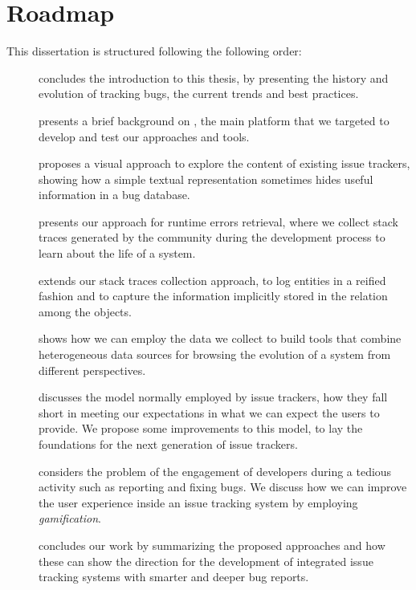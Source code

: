 \newpage
\section{Roadmap}

This dissertation is structured following the following order:

\begin{description}
 \item[] concludes the introduction to this thesis, by presenting the history and evolution of tracking bugs, the current trends and best practices.

 \item[] presents a brief background on \pha, the main platform that we targeted to develop and test our approaches and tools.

\item[] proposes a visual approach to explore the content of existing issue trackers, showing how a simple textual representation sometimes hides useful information in a bug database.

\item[] presents our approach for runtime errors retrieval, where we collect stack traces generated by the community during the development process to learn about the life of a system.

\item[] extends our stack traces collection approach, to log entities in a reified fashion and to capture the information implicitly stored in the relation among the objects.

\item[] shows how we can employ the data we collect to build tools that combine heterogeneous data sources for browsing the evolution of a system from different perspectives.

\item[] discusses the model normally employed by issue trackers, how they fall short in meeting our expectations in what we can expect the users to provide. We propose some improvements to this model, to lay the foundations for the next generation of issue trackers.

\item[] considers the problem of the engagement of developers during a tedious activity such as reporting and fixing bugs. We discuss how we can improve the user experience inside an issue tracking system by employing \emph{gamification}.

\item[] concludes our work by summarizing the proposed approaches and how these can show the direction for the development of integrated issue tracking systems with smarter and deeper bug reports.

\end{description}

